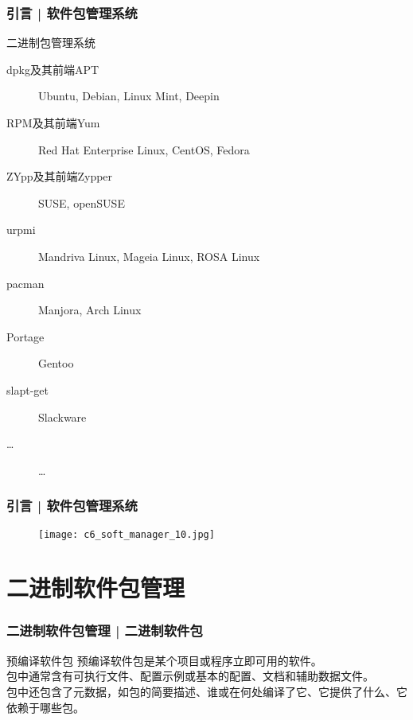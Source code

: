 \begin{frame}
  \frametitle{引言 | 软件包管理系统}
  \begin{block}{\alert{二进制包管理系统}}
    \begin{description}
      \item[dpkg及其前端APT] Ubuntu, Debian, Linux Mint, Deepin
      \item[RPM及其前端Yum] Red Hat Enterprise Linux, CentOS, Fedora
      \item[ZYpp及其前端Zypper] SUSE, openSUSE
      \item[urpmi] Mandriva Linux, Mageia Linux, ROSA Linux
      \item[pacman] Manjora, Arch Linux
      \item[Portage] Gentoo
      \item[slapt-get] Slackware
      \item[\ldots] \ldots
    \end{description}
  \end{block}
\end{frame}

\begin{frame}
  \frametitle{引言 | 软件包管理系统}
  \begin{figure}
    \centering
    \texttt{[image: c6\_soft\_manager\_10.jpg]}
  \end{figure}
\end{frame}

\section{二进制软件包管理}
\begin{frame}
  \frametitle{二进制软件包管理 | 二进制软件包}
  \begin{block}{预编译软件包}
    预编译软件包是某个项目或程序立即可用的软件。\\
    包中通常含有可执行文件、配置示例或基本的配置、文档和辅助数据文件。\\
    包中还包含了元数据，如包的简要描述、谁或在何处编译了它、它提供了什么、它依赖于哪些包。
  \end{block}
\end{frame}

